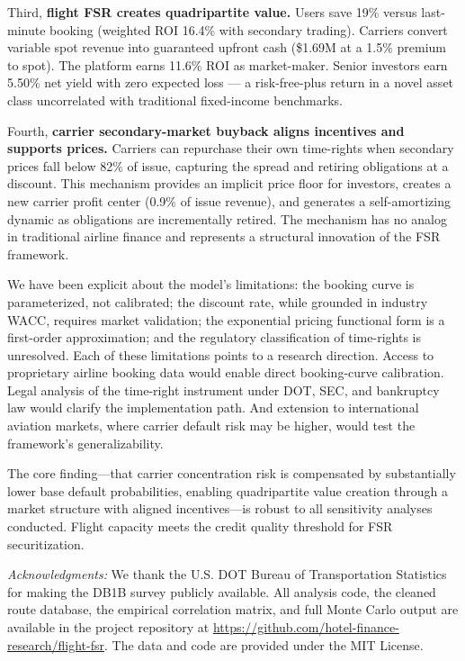 \documentclass[12pt,a4paper]{article}
\begin{document}
Third, \textbf{flight FSR creates quadripartite value.} Users save 19\% versus last-minute booking (weighted ROI 16.4\% with secondary trading). Carriers convert variable spot revenue into guaranteed upfront cash (\$1.69M at a 1.5\% premium to spot). The platform earns 11.6\% ROI as market-maker. Senior investors earn 5.50\% net yield with zero expected loss — a risk-free-plus return in a novel asset class uncorrelated with traditional fixed-income benchmarks.

Fourth, \textbf{carrier secondary-market buyback aligns incentives and supports prices.} Carriers can repurchase their own time-rights when secondary prices fall below 82\% of issue, capturing the spread and retiring obligations at a discount. This mechanism provides an implicit price floor for investors, creates a new carrier profit center (0.9\% of issue revenue), and generates a self-amortizing dynamic as obligations are incrementally retired. The mechanism has no analog in traditional airline finance and represents a structural innovation of the FSR framework.

We have been explicit about the model's limitations: the booking curve is parameterized, not calibrated; the discount rate, while grounded in industry WACC, requires market validation; the exponential pricing functional form is a first-order approximation; and the regulatory classification of time-rights is unresolved. Each of these limitations points to a research direction. Access to proprietary airline booking data would enable direct booking-curve calibration. Legal analysis of the time-right instrument under DOT, SEC, and bankruptcy law would clarify the implementation path. And extension to international aviation markets, where carrier default risk may be higher, would test the framework's generalizability.

The core finding---that carrier concentration risk is compensated by substantially lower base default probabilities, enabling quadripartite value creation through a market structure with aligned incentives---is robust to all sensitivity analyses conducted. Flight capacity meets the credit quality threshold for FSR securitization.

\bigskip
\noindent\textit{Acknowledgments:} We thank the U.S. DOT Bureau of Transportation Statistics for making the DB1B survey publicly available. All analysis code, the cleaned route database, the empirical correlation matrix, and full Monte Carlo output are available in the project repository at \url{https://github.com/hotel-finance-research/flight-fsr}. The data and code are provided under the MIT License.
\end{document}
